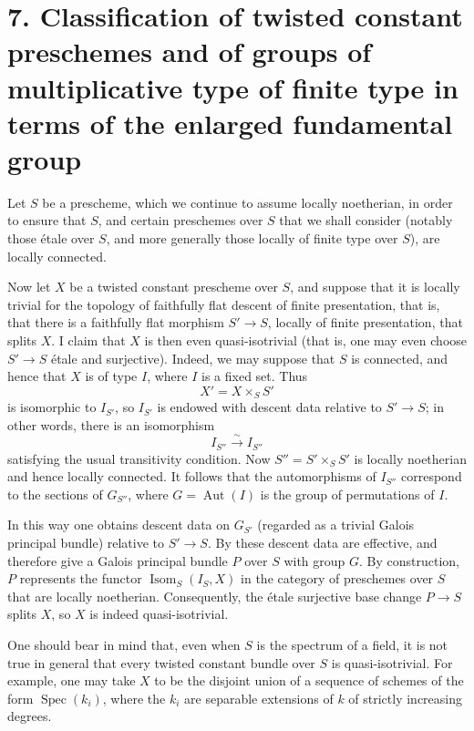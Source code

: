 \section*{7. Classification of twisted constant preschemes and of groups of
multiplicative type of finite type in terms of the enlarged fundamental group}

Let \(S\) be a prescheme, which we continue to assume locally noetherian, in
order to ensure that \(S\), and certain preschemes over \(S\) that we shall
consider (notably those étale over \(S\), and more generally those locally of
finite type over \(S\)), are locally connected.

Now let \(X\) be a twisted constant prescheme over \(S\), and suppose that
it is locally trivial for the topology of faithfully flat descent of
finite presentation, that is, that there is a faithfully flat morphism
\(S'\to S\), locally of finite presentation, that splits \(X\). I claim
that \(X\) is then even quasi-isotrivial (that is, one may even choose
\(S'\to S\) étale and surjective). Indeed, we may suppose that \(S\) is
connected, and hence that \(X\) is of
type \(I\), where \(I\) is a fixed set. Thus
\[
  X'=X\times_S S'
\]
is isomorphic to \(I_{S'}\), so \(I_{S'}\) is endowed with descent data
relative to \(S'\to S\); in other words, there is an isomorphism
\[
  I_{S''}\xrightarrow{\sim}I_{S''}
\]
satisfying the usual transitivity condition. Now
\(S''=S'\times_S S'\) is locally noetherian and hence locally connected.
It follows that the automorphisms of \(I_{S''}\) correspond to the sections
of \(G_{S''}\), where \(G=\operatorname{Aut}(I)\) is the group of
permutations of \(I\).

In this way one obtains descent data on \(G_{S'}\) (regarded as a trivial
Galois principal bundle) relative to \(S'\to S\). By  these descent data
are effective, and therefore give a Galois principal bundle \(P\) over \(S\)
with group \(G\). By construction, \(P\) represents the functor
\(\operatorname{Isom}_S(I_S,X)\) in the category of preschemes over \(S\)
that are locally noetherian. Consequently, the étale surjective base change
\(P\to S\) splits \(X\), so \(X\) is indeed quasi-isotrivial.

One should bear in mind that, even when \(S\) is the spectrum of a field, it
is not true in general that every twisted constant bundle over \(S\) is
quasi-isotrivial. For example, one may take \(X\) to be the disjoint union
of a sequence of schemes of the form \(\operatorname{Spec}(k_i)\), where
the \(k_i\) are separable extensions of \(k\) of strictly increasing
degrees.

